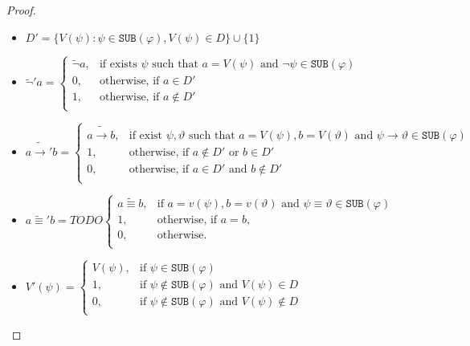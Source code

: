 \documentclass{article}
\theoremstyle{definition}
\theoremstyle{definition}
\newcommand*{\id}{\equiv}
\newcommand*{\ra}{\rightarrow}
\newcommand*{\SUB}{\texttt{SUB}}
\begin{document}
\begin{proof}
\begin{itemize}
        \item $D' = \{V(\psi) : \psi \in \SUB(\varphi), V(\psi) \in D\} \cup \{1\}$
        \item $
                  \tilde{\lnot}'a = \begin{cases}
                      \tilde{\lnot}a , & \text{if exists } \psi \text{ such that } a = V(\psi) \text{ and } \lnot \psi \in \SUB(\varphi) \\
                      0,               & \text{otherwise, if } a \in D'                                                                  \\
                      1,               & \text{otherwise, if } a \not \in D'                                                             \\
                  \end{cases}
              $
        \item $
                  a\tilde{\ra}'b = \begin{cases}
                      a\tilde{\ra}b , & \text{if exist } \psi, \vartheta \text{ such that } a = V(\psi), b = V(\vartheta) \text{ and } \psi \ra \vartheta \in \SUB(\varphi) \\
                      1,              & \text{otherwise, if } a \not \in D' \text{ or } b \in D'                                                                            \\
                      0,              & \text{otherwise, if } a \in D' \text{ and } b \not \in D'                                                                           \\
                  \end{cases}
              $
        \item $
                  a\tilde{\id}'b = TODO \begin{cases}
                      a\tilde{\id}b , & \text{if } a = v(\psi), b = v(\vartheta) \text{ and } \psi \id \vartheta \in \SUB(\varphi) \\
                      1,              & \text{otherwise, if } a = b,                                                               \\
                      0,              & \text{otherwise.}                                                                          \\
                  \end{cases}
              $
        \item $V'(\psi) = \begin{cases}
                      V(\psi) , & \text{if } \psi \in \SUB(\varphi)                                      \\
                      1,        & \text{if } \psi \not \in \SUB(\varphi) \text{ and } V(\psi) \in D      \\
                      0,        & \text{if } \psi \not \in \SUB(\varphi) \text{ and } V(\psi) \not \in D \\
                  \end{cases}$
    \end{itemize}


\end{proof}
\end{document}
